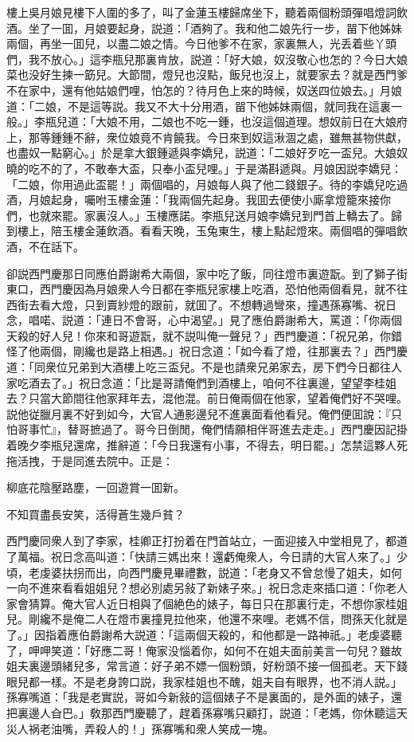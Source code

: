 樓上吳月娘見樓下人圍的多了，叫了金蓮玉樓歸席坐下，聽着兩個粉頭彈唱燈詞飲酒。坐了一囬，月娘要起身，説道：「酒夠了。我和他二娘先行一步，㽞下他姊妹兩個，再坐一囬兒，以盡二娘之情。今日他爹不在家，家裏無人，光丢着些丫頭們，我不放心。」這李瓶兒那裏肯放，説道：「好大娘，奴沒敬心也怎的？今日大娘菜也没好生揀一筯兒。大節間，燈兒也沒點，飯兒也沒上，就要家去？就是西門爹不在家中，還有他姑娘們哩，怕怎的？待月色上來的時候，奴送四位娘去。」月娘道：「二娘，不是這等説。我又不大十分用酒，㽞下他姊妹兩個，就同我在這裏一般。」李瓶兒道：「大娘不用，二娘也不吃一鍾，也沒這個道理。想奴前日在大娘府上，那等鍾鍾不辭，衆位娘竟不肯饒我。今日來到奴這湫涸之處，雖無甚物供獻，也盡奴一點窮心。」於是拿大銀鍾遞與李嬌兒，説道：「二娘好歹吃一盃兒。大娘奴曉的吃不的了，不敢奉大盃，只奉小盃兒哩。」于是滿斟遞與。月娘因説李嬌兒：「二娘，你用過此盃罷！」兩個唱的，月娘每人與了他二錢銀子。待的李嬌兒吃過酒，月娘起身，囑咐玉樓金蓮：「我兩個先起身。我囬去便使小廝拿燈籠來接你們，也就來罷。家裏沒人。」玉樓應諾。李瓶兒送月娘李嬌兒到門首上轎去了。歸到樓上，陪玉樓金蓮飲酒。看看天晚，玉兔東生，樓上點起燈來。兩個唱的彈唱飲酒，不在話下。

卻説西門慶那日同應伯爵謝希大兩個，家中吃了飯，同往燈市裏遊翫。到了獅子街東口，西門慶因為月娘衆人今日都在李瓶兒家樓上吃酒，恐怕他兩個看見，就不往西街去看大燈，只到賣紗燈的跟前，就囬了。不想轉過彎來，撞遇孫寡嘴、祝日念，唱喏、説道：「連日不會哥，心中渴望。」見了應伯爵謝希大，罵道：「你兩個天殺的好人兒！你來和哥遊翫，就不説叫俺一聲兒？」西門慶道：「祝兄弟，你錯怪了他兩個，剛纔也是路上相遇。」祝日念道：「如今看了燈，往那裏去？」西門慶道：「同衆位兄弟到大酒樓上吃三盃兒。不是也請衆兄弟家去，房下們今日都往人家吃酒去了。」祝日念道：「比是哥請俺們到酒樓上，咱何不往裏邊，望望李桂姐去？只當大節間往他家拜年去，混他混。前日俺兩個在他家，望着俺們好不哭哩。説他従臘月裏不好到如今，大官人通影邊兒不進裏面看他看兒。俺們便囬說：『只怕哥事忙』，替哥摭過了。哥今日倒閒，俺們情願相伴哥進去走走。」西門慶因記掛着晚夕李瓶兒還席，推辭道：「今日我還有小事，不得去，明日罷。」怎禁這夥人死拖活拽，于是同進去院中。正是：

\begin{myquote}
柳底花陰壓路塵，一回遊賞一囬新。

不知買盡長安笑，活得蒼生幾戶貧？
\end{myquote}

西門慶同衆人到了李家，桂卿正打扮着在門首站立，一面迎接入中堂相見了，都道了萬福。祝日念高叫道：「快請三媽出來！還虧俺衆人，今日請的大官人來了。」少頃，老虔婆扶拐而出，向西門慶見畢禮數，説道：「老身又不曾怠慢了姐夫，如何一向不進來看看姐姐兒？想必別處另敍了新婊子來。」祝日念走來插口道：「你老人家會猜算。俺大官人近日相與了個絶色的婊子，每日只在那裏行走，不想你家桂姐兒。剛纔不是俺二人在燈市裏撞見拉他來，他還不來哩。老媽不信，問孫天化就是了。」因指着應伯爵謝希大説道：「這兩個天殺的，和他都是一路神祇。」老虔婆聽了，呷呷笑道：「好應二哥！俺家没惱着你，如何不在姐夫面前美言一句兒？雖故姐夫裏邊頭緒兒多，常言道：好子弟不嫖一個粉頭，好粉頭不接一個孤老。天下錢眼兒都一樣。不是老身誇口説，我家桂姐也不醜，姐夫自有眼界，也不消人説。」孫寡嘴道：「我是老實説，哥如今新敍的這個婊子不是裏面的，是外面的婊子，還把裏邊人㒲巴。」敎那西門慶聽了，趕着孫寡嘴只顧打，説道：「老媽，你休聽這天災人祸老油嘴，弄殺人的！」孫寡嘴和衆人笑成一塊。

